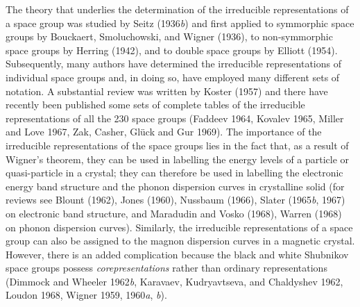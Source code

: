 \documentclass[11pt,a4paper,twoside,openright]{book}
\begin{document}
The theory that underlies the determination of the irreducible representations of a space group was studied by Seitz (1936\textit{b}) and first applied to symmorphic space groups by Bouckaert, Smoluchowski, and Wigner (1936), to non-symmorphic space groups by Herring (1942), and to double space groups by Elliott (1954). Subsequently, many authors have determined the irreducible representations of individual space groups and, in doing so, have employed many different sets of notation. A substantial review was written by Koster (1957) and there have recently been published some sets of complete tables of the irreducible representations of all the 230 space groups (Faddeev 1964, Kovalev 1965, Miller and Love 1967, Zak, Casher, Glück and Gur 1969). The importance of the irreducible representations of the space groups lies in the fact that, as a result of Wigner's theorem, they can be used in labelling the energy levels of a particle or quasi-particle in a crystal; they can therefore be used in labelling the electronic energy band structure and the phonon dispersion curves in crystalline solid (for reviews see Blount (1962), Jones (1960), Nussbaum (1966), Slater (1965\textit{b}, 1967) on electronic band structure, and Maradudin and Vosko (1968), Warren (1968) on phonon dispersion curves). Similarly, the irreducible representations of a space group can also be assigned to the magnon dispersion curves in a magnetic crystal. However, there is an added complication because the black and white Shubnikov space groups possess \textit{corepresentations} rather than ordinary representations (Dimmock and Wheeler 1962\textit{b}, Karavaev, Kudryavtseva, and Chaldyshev 1962, Loudon 1968, Wigner 1959, 1960\textit{a}, \textit{b}).
\end{document}
